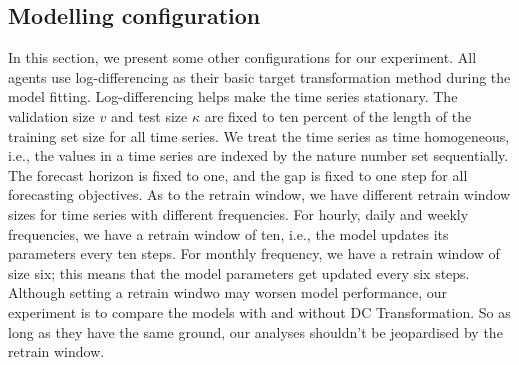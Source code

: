 \subsection{Modelling configuration}
In this section, we present some other configurations for our experiment. All agents use log-differencing as their basic target transformation method during the model fitting. Log-differencing helps make the time series stationary. The validation size $v$ and test size $\kappa$ are fixed to ten percent of the length of the training set size for all time series. We treat the time series as time homogeneous, i.e., the values in a time series are indexed by the nature number set sequentially. The forecast horizon is fixed to one, and the gap is fixed to one step for all forecasting objectives. As to the retrain window, we have different retrain window sizes for time series with different frequencies. For hourly, daily and weekly frequencies, we have a retrain window of ten, i.e., the model updates its parameters every ten steps. For monthly frequency, we have a retrain window of size six; this means that the model parameters get updated every six steps. Although setting a retrain windwo may worsen model performance, our experiment is to compare the models with and without DC Transformation. So as long as they have the same ground, our analyses shouldn't be jeopardised by the retrain window.
